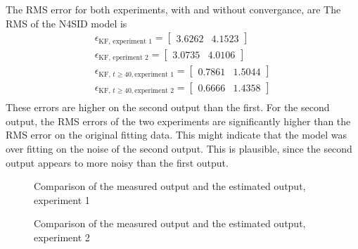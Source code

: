 The RMS error for both experiments, with and without convergance, are
The RMS of the N4SID model is
\begin{align*}
\epsilon_{\text{KF, experiment 1}} = \begin{bmatrix} 3.6262 & 4.1523 \end{bmatrix}\\
\epsilon_{\text{KF, eperiment 2}} = \begin{bmatrix} 3.0735 & 4.0106 \end{bmatrix}\\
\epsilon_{\text{KF, } t\geq40,\text{experiment 1}} = \begin{bmatrix} 0.7861 & 1.5044 \end{bmatrix}\\
\epsilon_{\text{KF, } t\geq40, \text{experiment 2}} = \begin{bmatrix} 0.6666 & 1.4358 \end{bmatrix}\\
\end{align*}
These errors are higher on the second output than the first. For the second output, the RMS errors of the two experiments are significantly higher than the RMS error on the original fitting data. This might indicate that the model was over fitting on the noise of the second output. This is plausible, since the second output appears to more noisy than the first output.
\begin{figure}
    \centering
    
    \caption{Comparison of the measured output and the estimated output, experiment 1}
    \label{fig:comp_Kalman1}
\end{figure}
\begin{figure}
    \centering
    
    \caption{Comparison of the measured output and the estimated output, experiment 2}
    \label{fig:comp_Kalman2}
\end{figure}
